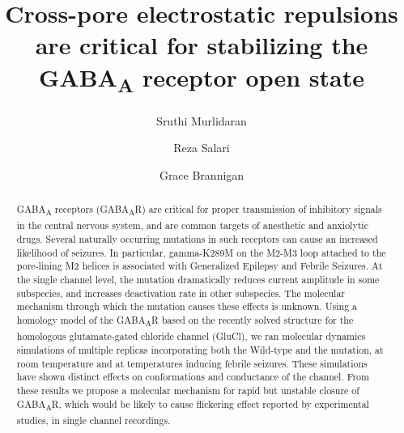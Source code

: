 \documentclass[9pt,twocolumn,twoside,lineno]{pnas-new}
\begin{document}
\title{Cross-pore electrostatic repulsions are critical for stabilizing the GABA\textsubscript{A} receptor open state}

\author[a,1]{Sruthi Murlidaran}
\author[a,b,2]{Reza Salari}
\author[a,b,3]{Grace Brannigan}


\newcommand{\GABAA}{GABA\textsubscript{A}R\xspace}
\newcommand{\avgr}{\bar{r}}
\newcommand{\varr}{\delta r^{2}}
\newcommand{\plgics}{pLGICs}
\newcommand{\nachr}{nAChR}


\begin{abstract}
{GABA\textsubscript{A} receptors (\GABAA) are critical for proper transmission of inhibitory signals in the central nervous system, and are common targets of anesthetic and anxiolytic drugs.  Several naturally occurring mutations in such receptors can cause an increased likelihood of seizures. In particular, gamma-K289M on the M2-M3 loop attached to the pore-lining M2 helices is associated with Generalized Epilepsy and Febrile Seizures.   At the single channel level, the mutation dramatically reduces current amplitude in some subspecies, and increases deactivation rate in other subspecies.  The molecular mechanism through which the mutation causes these effects is unknown.  Using a homology model of the \GABAA  based on the recently solved structure for the homologous glutamate-gated chloride channel (GluCl), we ran molecular dynamics simulations  of multiple replicas incorporating both the Wild-type and the mutation, at room temperature and at temperatures inducing febrile seizures. These simulations have shown distinct effects on conformations and conductance of the channel. From these results we propose a molecular mechanism for rapid but unstable closure of \GABAA, which would be likely to cause flickering effect reported by experimental studies, in single channel recordings.}
\end{abstract}

\maketitle
\thispagestyle{firststyle}
\end{document}
